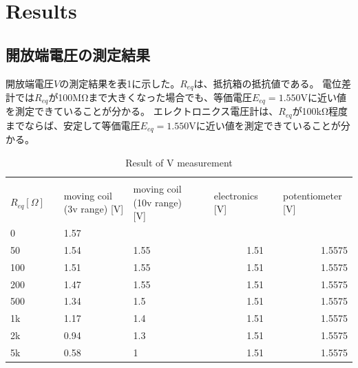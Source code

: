 \documentclass[a4paper,10pt]{jsarticle}
\begin{document}
\section{Results}
\subsection{開放端電圧の測定結果}
開放端電圧$V$の測定結果を表1に示した。$R_{eq}$は、抵抗箱の抵抗値である。
電位差計では$R_{eq}$が100MΩまで大きくなった場合でも、等価電圧$E_{eq} = 1.550$Vに近い値を測定できていることが分かる。
エレクトロニクス電圧計は、$R_{eq}$が100kΩ程度までならば、安定して等価電圧$E_{eq} = 1.550$Vに近い値を測定できていることが分かる。\\

\begin{table}[htbp]
  \centering
  \caption{Result of V measurement}
    \begin{tabular}{rrrrrrrr}
          &       & \multicolumn{2}{c}{} &       &       &       &  \\
    \multicolumn{1}{l}{$R_{eq}  [\Omega]$} &       & \multicolumn{1}{l}{moving coil (3v range) [V]} & \multicolumn{1}{l}{moving coil (10v range) [V]} &       & \multicolumn{1}{l}{electronics [V]} &       & \multicolumn{1}{l}{potentiometer [V]} \\
    \midrule
    \midrule
    \multicolumn{1}{l}{0} &       & \multicolumn{1}{l}{1.57} &       &       &       &       &  \\
    \multicolumn{1}{l}{50} &       & \multicolumn{1}{l}{1.54} & \multicolumn{1}{l}{1.55} &       & 1.51  &       & 1.5575 \\
    \multicolumn{1}{l}{100} &       & \multicolumn{1}{l}{1.51} & \multicolumn{1}{l}{1.55} &       & 1.51  &       & 1.5575 \\
    \multicolumn{1}{l}{200} &       & \multicolumn{1}{l}{1.47} & \multicolumn{1}{l}{1.55} &       & 1.51  &       & 1.5575 \\
    \multicolumn{1}{l}{500} &       & \multicolumn{1}{l}{1.34} & \multicolumn{1}{l}{1.5} &       & 1.51  &       & 1.5575 \\
    \multicolumn{1}{l}{1k} &       & \multicolumn{1}{l}{1.17} & \multicolumn{1}{l}{1.4} &       & 1.51  &       & 1.5575 \\
    \multicolumn{1}{l}{2k} &       & \multicolumn{1}{l}{0.94} & \multicolumn{1}{l}{1.3} &       & 1.51  &       & 1.5575 \\
    \multicolumn{1}{l}{5k} &       & \multicolumn{1}{l}{0.58} & \multicolumn{1}{l}{1} &       & 1.51  &       & 1.5575 \\

\end{tabular}
\end{table}
\end{document}
